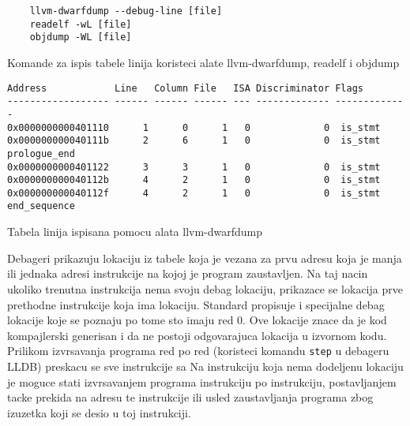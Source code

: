 \documentclass[12pt,oneside]{memoir}
\begin{document}
\begin{listing}
  \begin{verbatim}
    llvm-dwarfdump --debug-line [file]
    readelf -wL [file]
    objdump -WL [file]
  \end{verbatim}
  \label{lst:debug_line_commands}
  \caption{Komande za ispis tabele linija koristeci alate llvm-dwarfdump, readelf i objdump}
\end{listing}

\begin{listing}
  \begin{verbatim}
Address            Line   Column File   ISA Discriminator Flags
------------------ ------ ------ ------ --- ------------- -------------
0x0000000000401110      1      0      1   0             0  is_stmt
0x000000000040111b      2      6      1   0             0  is_stmt prologue_end
0x0000000000401122      3      3      1   0             0  is_stmt
0x000000000040112b      4      2      1   0             0  is_stmt
0x000000000040112f      4      2      1   0             0  is_stmt end_sequence
  \end{verbatim}
  \label{lst:line_table}
  \caption{Tabela linija ispisana pomocu alata llvm-dwarfdump}
\end{listing}


Debageri prikazuju lokaciju iz tabele koja je vezana za prvu adresu koja je manja ili jednaka adresi instrukcije na kojoj je program zaustavljen.
Na taj nacin ukoliko trenutna instrukcija nema svoju debag lokaciju, prikazace se lokacija prve prethodne instrukcije koja ima lokaciju.
Standard propisuje i specijalne debag lokacije koje se poznaju po tome sto imaju red 0.
Ove lokacije znace da je kod kompajlerski generisan i da ne postoji odgovarajuca lokacija u izvornom kodu.
Prilikom izvrsavanja programa red po red (koristeci komandu \verb|step| u debageru LLDB) preskacu se sve instrukcije sa 
Na instrukciju koja nema dodeljenu lokaciju je moguce stati izvrsavanjem programa instrukciju po instrukciju, postavljanjem tacke prekida na adresu te instrukcije ili usled zaustavljanja programa zbog izuzetka koji se desio u toj instrukciji.

\end{document}
